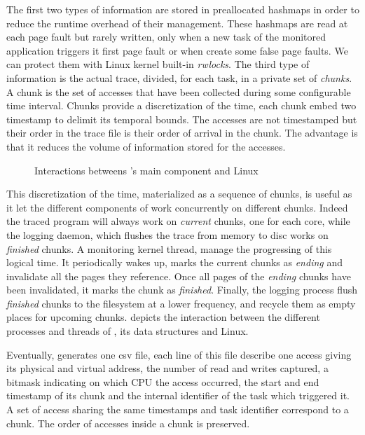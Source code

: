 The first two types of information are stored in preallocated hashmaps in order to reduce the
runtime overhead of their management.  These hashmaps are read at each page fault but rarely
written, only when a new task of the monitored application triggers it first page
fault or when \Moca create some false page faults. We can protect
them with Linux kernel built-in \emph{rwlocks}.
The third type of information is the actual
trace, divided, for each task, in a private set of \emph{chunks}. A chunk is the set of
accesses that have been collected during some configurable time interval. Chunks provide a discretization
of the time, each chunk embed two timestamp to delimit its temporal bounds.
The accesses are not timestamped but their order in the trace file is their
order of arrival in the chunk.
The advantage is that it reduces the volume of information stored for the accesses.

\begin{figure}[htb]
    \centering
    \caption{Interactions betweens \Moca's main component and Linux}
    \label{fig:moca}
\end{figure}

This discretization of the time, materialized as a sequence of chunks, is useful as it let the
different components of \Moca work concurrently on different chunks.  Indeed the traced
program will always work on \emph{current} chunks, one for each core, while the logging daemon,
which flushes the trace from memory to disc works on \emph{finished} chunks. A
monitoring kernel thread, manage the progressing of this logical time. It periodically wakes up, marks the current chunks as
\emph{ending} and invalidate all the pages they reference. Once all pages of the \emph{ending}
chunks have been invalidated, it marks the chunk as \emph{finished}. Finally, the
logging process flush \emph{finished} chunks to the filesystem at a lower
frequency, and recycle them as empty places for upcoming chunks.   depicts the interaction between the
different processes and threads of \Moca, its data structures and Linux.

Eventually, \Moca generates one csv file, each line of this file
describe one access giving its physical and virtual address, the number of
read and writes captured, a bitmask indicating on which CPU the access
occurred, the start and end timestamp of its chunk and the
internal identifier of the task which triggered it. A set of access sharing the same
timestamps and task identifier correspond to a chunk. The order of accesses inside a
chunk is preserved.

